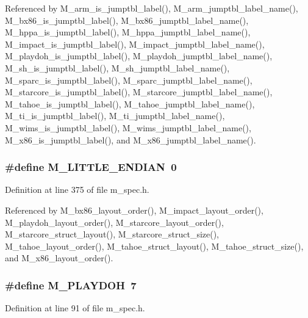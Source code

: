 Referenced by M\_\-arm\_\-is\_\-jumptbl\_\-label(), M\_\-arm\_\-jumptbl\_\-label\_\-name(), M\_\-bx86\_\-is\_\-jumptbl\_\-label(), M\_\-bx86\_\-jumptbl\_\-label\_\-name(), M\_\-hppa\_\-is\_\-jumptbl\_\-label(), M\_\-hppa\_\-jumptbl\_\-label\_\-name(), M\_\-impact\_\-is\_\-jumptbl\_\-label(), M\_\-impact\_\-jumptbl\_\-label\_\-name(), M\_\-playdoh\_\-is\_\-jumptbl\_\-label(), M\_\-playdoh\_\-jumptbl\_\-label\_\-name(), M\_\-sh\_\-is\_\-jumptbl\_\-label(), M\_\-sh\_\-jumptbl\_\-label\_\-name(), M\_\-sparc\_\-is\_\-jumptbl\_\-label(), M\_\-sparc\_\-jumptbl\_\-label\_\-name(), M\_\-starcore\_\-is\_\-jumptbl\_\-label(), M\_\-starcore\_\-jumptbl\_\-label\_\-name(), M\_\-tahoe\_\-is\_\-jumptbl\_\-label(), M\_\-tahoe\_\-jumptbl\_\-label\_\-name(), M\_\-ti\_\-is\_\-jumptbl\_\-label(), M\_\-ti\_\-jumptbl\_\-label\_\-name(), M\_\-wims\_\-is\_\-jumptbl\_\-label(), M\_\-wims\_\-jumptbl\_\-label\_\-name(), M\_\-x86\_\-is\_\-jumptbl\_\-label(), and M\_\-x86\_\-jumptbl\_\-label\_\-name().
\subsubsection{\setlength{\rightskip}{0pt plus 5cm}\#define M\_\-LITTLE\_\-ENDIAN~0}\label{m__spec_8h_1739c3134a72ecd13ef23820f1189aaa}




Definition at line 375 of file m\_\-spec.h.

Referenced by M\_\-bx86\_\-layout\_\-order(), M\_\-impact\_\-layout\_\-order(), M\_\-playdoh\_\-layout\_\-order(), M\_\-starcore\_\-layout\_\-order(), M\_\-starcore\_\-struct\_\-layout(), M\_\-starcore\_\-struct\_\-size(), M\_\-tahoe\_\-layout\_\-order(), M\_\-tahoe\_\-struct\_\-layout(), M\_\-tahoe\_\-struct\_\-size(), and M\_\-x86\_\-layout\_\-order().
\subsubsection{\setlength{\rightskip}{0pt plus 5cm}\#define M\_\-PLAYDOH~7}\label{m__spec_8h_3f108fe66cd00d8c4f2f77d8cf4bd58b}




Definition at line 91 of file m\_\-spec.h.

